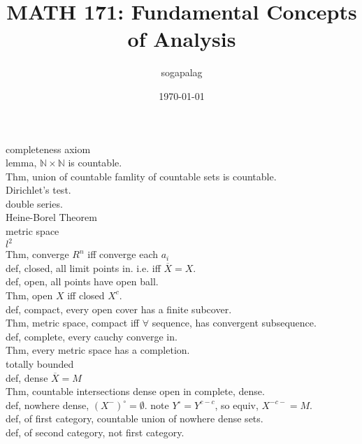 \documentclass[paper=a4, fontsize=11pt]{scrartcl} %
\title{MATH 171: Fundamental Concepts of Analysis}
\author{sogapalag}
\date{\normalsize\today}
\numberwithin{equation}{section} %
\numberwithin{figure}{section} %
\numberwithin{table}{section} %
\begin{document}
\maketitle
completeness axiom\\
lemma, $\mathbb{N}\times \mathbb{N}$ is countable.\\
Thm, union of countable famlity of countable sets is countable.\\
Dirichlet's test.\\
double series.\\
Heine-Borel Theorem\\
metric space\\
$l^2$\\
Thm, converge $R^n$ iff converge each $a_i$\\
def, closed, all limit points in. i.e. iff $\overline{X}= X$.\\
def, open, all points have open ball.\\
Thm, open $X$ iff closed $X^c$.\\
def, compact, every open cover has a finite subcover.\\
Thm, metric space, compact iff $\forall$ sequence, has convergent subsequence.\\
def, complete, every cauchy converge in.\\
Thm, every metric space has a completion.\\
totally bounded\\
def, dense $\overline{X}=M$\\
Thm, countable intersections dense open in complete, dense.\\
def, nowhere dense, $(X^-)^\circ=\emptyset$. note $Y^{\circ}=Y^{c-c}$, so equiv, $X^{-c-}=M$.\\
def, of first category, countable union of nowhere dense sets.\\
def, of second category, not first category.\\
\end{document}
